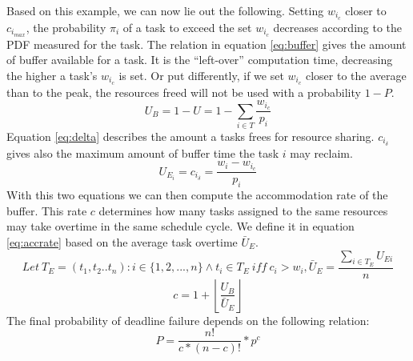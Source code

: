 \documentclass[]{scrartcl}
\begin{document}
Based on this example, we can now lie out the following.
Setting $w_{i_c}$ closer to $c_{i_{max}}$, the probability $\pi_i$ of a task to exceed the set $w_{i_c}$ decreases according to the PDF measured for the task. 
The relation in equation \ref{eq:buffer} gives the amount of buffer available for a task. It is the ``left-over'' computation time, decreasing the higher a task's $w_{i_c}$ is set.
Or put differently, if we set $w_{i_c}$ closer to the average than to the peak, the resources freed will not be used with a probability $1-P$. 
\begin{equation}
	\label{eq:buffer}
	U_B = 1 - U = 1 - \sum_{i \in T} \frac{w_{i_c}}{p_i}
\end{equation}
Equation \ref{eq:delta} describes the amount a tasks frees for resource sharing. $c_{i_\delta}$ gives also the maximum amount of buffer time the task $i$ may reclaim. 
\begin{equation}
	\label{eq:delta}
	U_{E_i} = c_{i_\delta} = \frac{w_{i}- w_{i_c}}{p_i}
\end{equation}
With this two equations we can then compute the accommodation rate of the buffer. This rate $c$ determines how many tasks assigned to the same resources may take overtime in the same schedule cycle.
We define it in equation \ref{eq:accrate} based on the average task overtime $\bar U_E$.
\begin{equation}
	Let \ T_E = ( t_1, t_2 .. t_n) : i \in \lbrace 1,2,...,n \rbrace \land t_i \in T_E \ iff \ c_i > w_i, 
	\bar U_E = \frac{\sum_{i \in T_E} U_{Ei}}{n}		
\end{equation}
\begin{equation}
	\label{eq:accrate}
	c = 1 + {\left\lfloor \frac{U_B}{\bar U_E} \right\rfloor}
\end{equation}
The final probability of deadline failure depends on the following relation:
\begin{equation}
	\label{eq:prob}
	P = \frac{n!}{c*(n-c)!} * p^c
\end{equation}
\end{document}
